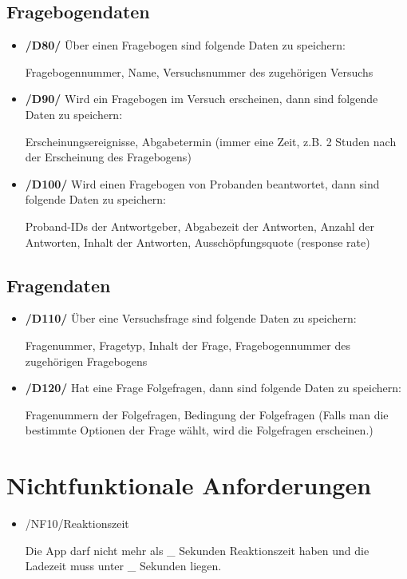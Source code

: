 \documentclass[a4paper]{scrreprt}
\begin{document}
        \section{Fragebogendaten}
            \begin{itemize}
                \item \textbf{/D80/} Über einen Fragebogen sind folgende Daten zu speichern:
                \par Fragebogennummer, Name, Versuchsnummer des zugehörigen Versuchs

                \item \textbf{/D90/} Wird ein Fragebogen im Versuch erscheinen, dann sind folgende Daten zu speichern:
                \par Erscheinungsereignisse, Abgabetermin (immer eine Zeit, z.B. 2 Studen nach der Erscheinung des Fragebogens)

                \item \textbf{/D100/} Wird einen Fragebogen von \gls{Proband}en beantwortet, dann sind folgende Daten zu speichern:
                \par \gls{Proband}-IDs der Antwortgeber, Abgabezeit der Antworten, Anzahl der Antworten, Inhalt der Antworten, Ausschöpfungsquote (response rate)
            \end{itemize}

        \section{Fragendaten}
            \begin{itemize}
                \item \textbf{/D110/} Über eine Versuchsfrage sind folgende Daten zu speichern:
                    \par Fragenummer, Fragetyp, Inhalt der Frage, Fragebogennummer des zugehörigen Fragebogens

                \item \textbf{/D120/} Hat eine Frage Folgefragen, dann sind folgende Daten zu speichern:
                    \par Fragenummern der Folgefragen, Bedingung der Folgefragen (Falls man die bestimmte Optionen der Frage wählt, wird die Folgefragen erscheinen.)
            \end{itemize}

   \chapter{Nichtfunktionale Anforderungen}
        \begin{itemize}
            \item /NF10/Reaktionszeit

                \par Die App darf nicht mehr als \_ Sekunden Reaktionszeit haben und die Ladezeit muss unter \_ Sekunden liegen.


        \end{itemize}
\end{document}
